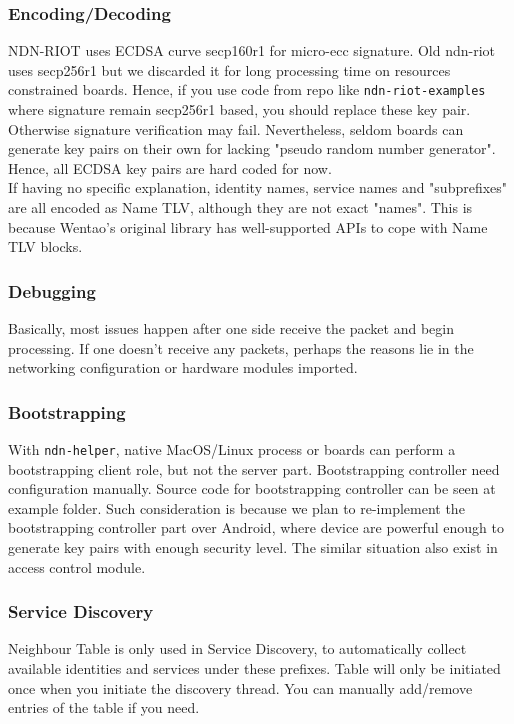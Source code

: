 \documentclass[a4paper, 11pt]{article}
\begin{document}
        \subsubsection*{Encoding/Decoding}
        NDN-RIOT uses ECDSA curve secp160r1 for micro-ecc signature. Old ndn-riot uses secp256r1 but we discarded it for long processing time on resources constrained boards. Hence, if you use code from repo like \texttt{ndn-riot-examples} where signature remain secp256r1 based, you should replace these key pair. Otherwise signature verification may fail. Nevertheless, seldom boards can generate key pairs on their own for lacking "pseudo random number generator". Hence, all ECDSA key pairs are hard coded for now. \\
        If having no specific explanation, identity names, service names and "subprefixes" are all encoded as Name TLV, although they are not exact "names". This is because Wentao's original library has well-supported APIs to cope with Name TLV blocks.

        \subsubsection*{Debugging}
        Basically, most issues happen after one side receive the packet and begin processing. If one doesn't receive any packets, perhaps the reasons lie in the networking configuration or hardware modules imported.
        
        \subsubsection*{Bootstrapping}
        With \texttt{ndn-helper}, native MacOS/Linux process or boards can perform a bootstrapping client role, but not the server part. Bootstrapping controller need configuration manually. Source code for bootstrapping controller can be seen at example folder. Such consideration is because we plan to re-implement the bootstrapping controller part over Android, where device are powerful enough to generate key pairs with enough security level. The similar situation also exist in access control module.
        
        \subsubsection*{Service Discovery}
        Neighbour Table is only used in Service Discovery, to automatically collect available identities and services under these prefixes. Table will only be initiated once when you initiate the discovery thread. You can manually add/remove entries of the table if you need.
        
\end{document}
